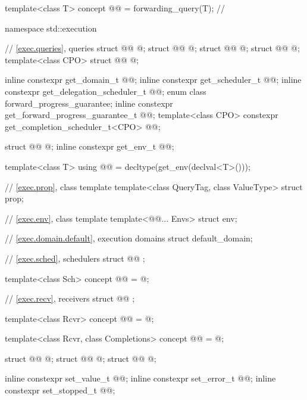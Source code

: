 \begin{codeblock}
{  template<class T>
    concept @@ = forwarding_query(T{});           // \expos
}

namespace std::execution {
  // \ref{exec.queries}, queries
  struct @@ { @\unspec@ };
  struct @@ { @\unspec@ };
  struct @@ { @\unspec@ };
  struct @@ { @\unspec@ };
  template<class CPO>
    struct @@ { @\unspec@ };

  inline constexpr get_domain_t @@{};
  inline constexpr get_scheduler_t @@{};
  inline constexpr get_delegation_scheduler_t @@{};
  enum class forward_progress_guarantee;
  inline constexpr get_forward_progress_guarantee_t @@{};
  template<class CPO>
    constexpr get_completion_scheduler_t<CPO> @@{};

  struct @@ { @\unspec@ };
  inline constexpr get_env_t @@{};

  template<class T>
    using @@ = decltype(get_env(declval<T>()));

  // \ref{exec.prop}, class template 
  template<class QueryTag, class ValueType>
    struct prop;

  // \ref{exec.env}, class template 
  template<@@... Envs>
    struct env;

  // \ref{exec.domain.default}, execution domains
  struct default_domain;

  // \ref{exec.sched}, schedulers
  struct @@ {};

  template<class Sch>
    concept @@ = @\seebelow@;

  // \ref{exec.recv}, receivers
  struct @@ {};

  template<class Rcvr>
    concept @@ = @\seebelow@;

  template<class Rcvr, class Completions>
    concept @@ = @\seebelow@;

  struct @@ { @\unspec@ };
  struct @@ { @\unspec@ };
  struct @@ { @\unspec@ };

  inline constexpr set_value_t @@{};
  inline constexpr set_error_t @@{};
  inline constexpr set_stopped_t @@{};

}
\end{codeblock}
